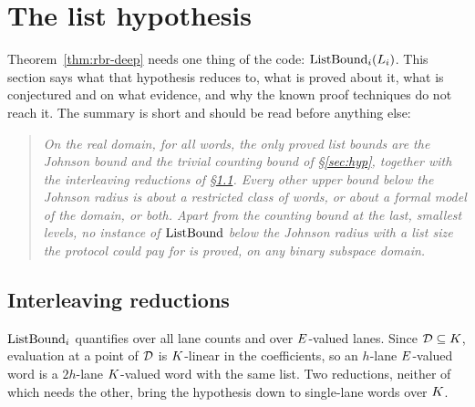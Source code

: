 \section{The list hypothesis}\label{sec:lists}

Theorem~\ref{thm:rbr-deep} needs one thing of the code: $\mathrm{ListBound}_i(L_i)$. This section says what that hypothesis reduces to, what is proved about it, what is conjectured and on what evidence, and why the known proof techniques do not reach it. The summary is short and should be read before anything else:

\begin{quote}
\emph{On the real domain, for all words, the only proved list bounds are the Johnson bound and the trivial counting bound of \S\ref{sec:hyp}, together with the interleaving reductions of \S\ref{sec:interleave}. Every other upper bound below the Johnson radius is about a restricted class of words, or about a formal model of the domain, or both. Apart from the counting bound at the last, smallest levels, no instance of $\mathrm{ListBound}$ below the Johnson radius with a list size the protocol could pay for is proved, on any binary subspace domain.}
\end{quote}

\subsection{Interleaving reductions}\label{sec:interleave}

$\mathrm{ListBound}_i$ quantifies over all lane counts and over $E$-valued lanes. Since $\mathcal{D}\subseteq K$, evaluation at a point of $\mathcal{D}$ is $K$-linear in the coefficients, so an $h$-lane $E$-valued word is a $2h$-lane $K$-valued word with the same list. Two reductions, neither of which needs the other, bring the hypothesis down to single-lane words over $K$.

